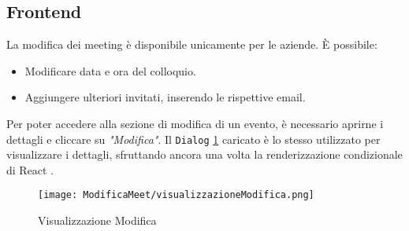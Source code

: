 \subsection{Frontend}
La modifica dei meeting è disponibile unicamente per le aziende. È possibile:
\begin{itemize}
    \item Modificare data e ora del colloquio.
    \item Aggiungere ulteriori invitati, inserendo le rispettive email.
\end{itemize}
Per poter accedere alla sezione di modifica di un evento, è necessario aprirne i dettagli e cliccare su \textit{"Modifica"}. 
Il \texttt{Dialog} \ref{visualizzazione_modifica} caricato è lo stesso utilizzato per visualizzare i dettagli, sfruttando ancora una volta la renderizzazione
condizionale di React . \cite{reactConditionalRendering}
\begin{figure}[H]   
    \centering
    \texttt{[image: ModificaMeet/visualizzazioneModifica.png]}
    \caption{Visualizzazione Modifica}
    \label{visualizzazione_modifica}
\end{figure}
